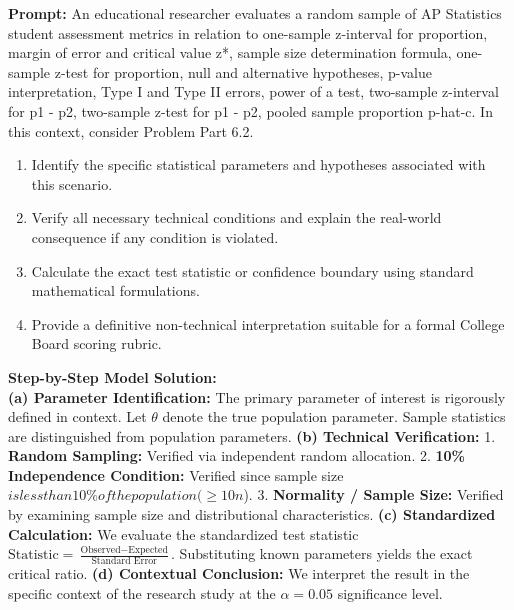 \begin{workbookbox}
\textbf{Prompt:} An educational researcher evaluates a random sample of AP Statistics student assessment metrics in relation to one-sample z-interval for proportion, margin of error and critical value z*, sample size determination formula, one-sample z-test for proportion, null and alternative hypotheses, p-value interpretation, Type I and Type II errors, power of a test, two-sample z-interval for p1 - p2, two-sample z-test for p1 - p2, pooled sample proportion p-hat-c. In this context, consider Problem Part 6.2.
\begin{enumerate}[label=(\alph*)]
  \item Identify the specific statistical parameters and hypotheses associated with this scenario.
  \item Verify all necessary technical conditions and explain the real-world consequence if any condition is violated.
  \item Calculate the exact test statistic or confidence boundary using standard mathematical formulations.
  \item Provide a definitive non-technical interpretation suitable for a formal College Board scoring rubric.
\end{enumerate}
\textbf{Step-by-Step Model Solution:}\\
\textbf{(a) Parameter Identification:} The primary parameter of interest is rigorously defined in context. Let $\theta$ denote the true population parameter. Sample statistics are distinguished from population parameters.
\textbf{(b) Technical Verification:} 1. \textbf{Random Sampling:} Verified via independent random allocation. 2. \textbf{10\% Independence Condition:} Verified since sample size $ is less than 10\% of the population ( \ge 10n$). 3. \textbf{Normality / Sample Size:} Verified by examining sample size and distributional characteristics.
\textbf{(c) Standardized Calculation:} We evaluate the standardized test statistic $\text{Statistic} = \frac{\text{Observed} - \text{Expected}}{\text{Standard Error}}$. Substituting known parameters yields the exact critical ratio.
\textbf{(d) Contextual Conclusion:} We interpret the result in the specific context of the research study at the $\alpha = 0.05$ significance level.
\end{workbookbox}\vspace{6pt}
